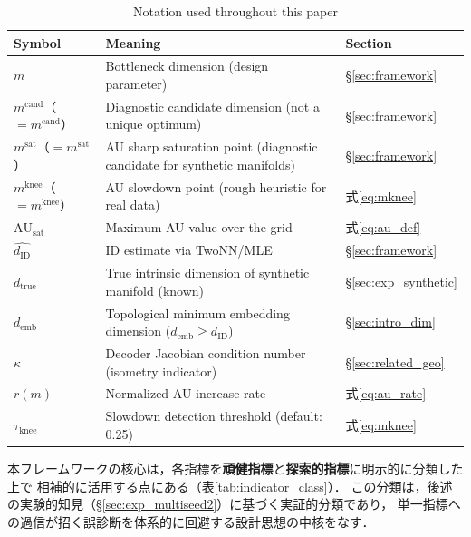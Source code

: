 \documentclass[11pt,a4paper]{jsarticle}
\newcommand{\dID}{d_{\mathrm{ID}}}
\newcommand{\dzopt}{m^{\mathrm{cand}}}
\newcommand{\dtrue}{d_{\mathrm{true}}}
\newcommand{\kap}{\kappa}
\newcommand{\AUsat}{\mathrm{AU}_{\mathrm{sat}}}
\newcommand{\dzsat}{m^{\mathrm{sat}}}
\newcommand{\mknee}{m^{\mathrm{knee}}}
\newcommand{\demb}{d_{\mathrm{emb}}}
\begin{document}
\begin{table}[H]
\centering
\caption{Notation used throughout this paper}
\label{tab:notation}
\small
\begin{tabular}{lll}
\toprule
Symbol & Meaning & Section \\
\midrule
$m$ & Bottleneck dimension (design parameter) & §\ref{sec:framework} \\
$\dzopt$（$= m^{\mathrm{cand}}$） & Diagnostic candidate dimension (not a unique optimum) & §\ref{sec:framework} \\
$\dzsat$（$= m^{\mathrm{sat}}$） & AU sharp saturation point (diagnostic candidate for synthetic manifolds) & §\ref{sec:framework} \\
$\mknee$（$= m^{\mathrm{knee}}$） & AU slowdown point (rough heuristic for real data) & 式\eqref{eq:mknee} \\
$\AUsat$ & Maximum AU value over the grid & 式\eqref{eq:au_def} \\
$\hat{\dID}$ & ID estimate via TwoNN/MLE & §\ref{sec:framework} \\
$\dtrue$ & True intrinsic dimension of synthetic manifold (known) & §\ref{sec:exp_synthetic} \\
$\demb$ & Topological minimum embedding dimension ($\demb \geq \dID$) & §\ref{sec:intro_dim} \\
$\kap$ & Decoder Jacobian condition number (isometry indicator) & §\ref{sec:related_geo} \\
$r(m)$ & Normalized AU increase rate & 式\eqref{eq:au_rate} \\
$\tau_{\mathrm{knee}}$ & Slowdown detection threshold (default: 0.25) & 式\eqref{eq:mknee} \\
\bottomrule
\end{tabular}
\end{table}

本フレームワークの核心は，各指標を\textbf{頑健指標}と\textbf{探索的指標}に明示的に分類した上で
相補的に活用する点にある（表\ref{tab:indicator_class}）．
この分類は，後述の実験的知見（§\ref{sec:exp_multiseed2}）に基づく実証的分類であり，
単一指標への過信が招く誤診断を体系的に回避する設計思想の中核をなす．
\end{document}
